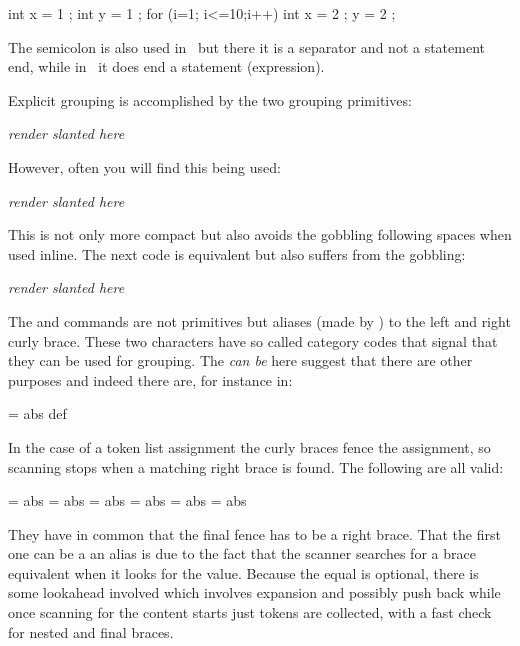 \starttyping
int x = 1 ;
int y = 1 ;
for (i=1; i<=10;i++) {
    int x = 2 ;
    y = 2 ;
}
\stoptyping

The semicolon is also used in \PASCAL\ but there it is a separator and not a
statement end, while in \METAPOST\ it does end a statement (expression).

\stopsectionlevel

\stopsectionlevel

\startsectionlevel[title=Kinds of grouping]

Explicit grouping is accomplished by the two grouping primitives:

\starttyping
\begingroup
    \sl render slanted here
\endgroup
\stoptyping

However, often you will find this being used:

\starttyping
{\sl render slanted here}
\stoptyping

This is not only more compact but also avoids the \type {\endgroup} gobbling
following spaces when used inline. The next code is equivalent but also suffers
from the gobbling:

\starttyping
\bgroup
    \sl render slanted here
\egroup
\stoptyping

The \type {\bgroup} and \type {\egroup} commands are not primitives but aliases
(made by \type {\let}) to the left and right curly brace. These two characters
have so called category codes that signal that they can be used for grouping. The
{\em can be} here suggest that there are other purposes and indeed there are, for
instance in:

\starttyping
{} = {abs}
\hbox {def}
\stoptyping

In the case of a token list assignment the curly braces fence the assignment, so scanning
stops when a matching right brace is found. The following are all valid:

\starttyping
{} = {a{b}s}
 = \bgroup a{b}s}
 = {a{\bgroup b}s}
 = {a{\egroup b}s}
 = \bgroup a{\bgroup b}s}
 = \bgroup a{\egroup b}s}
\stoptyping

They have in common that the final fence has to be a right brace. That the first
one can be a an alias is due to the fact that the scanner searches for a brace
equivalent when it looks for the value. Because the equal is optional, there is
some lookahead involved which involves expansion and possibly push back while
once scanning for the content starts just tokens are collected, with a fast
check for nested and final braces.

